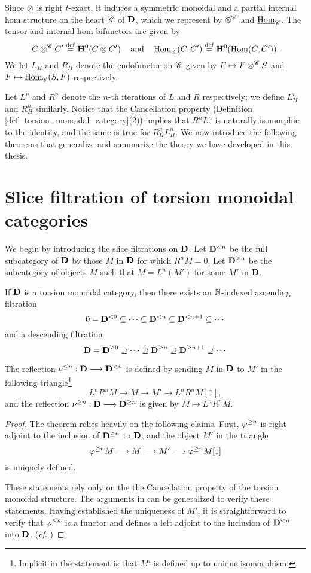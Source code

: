 Since $\otimes$ is right $t$-exact, it induces a symmetric 
monoidal and a partial internal hom structure on the heart 
$\mathscr{C}$ of $\mathbf{D}$, which we represent by $\otimes^{\mathscr{C}}$ 
and $\underline{\mathrm{Hom}}_{\mathscr{C}}$. The tensor and internal hom bifunctors
are given by
\[
C \otimes^{\mathscr{C}} C' \stackrel{\mathrm{def}}{=} \mathbf{H}^0(C \otimes C') 
   \;\;\;\textrm{ and }\;\;\;
\underline{\mathrm{Hom}}_{\mathscr{C}}(C, C') \stackrel{\mathrm{def}}{=} \mathbf{H}^0(\underline{\mathrm{Hom}}(C, C')).
\]
We let $L_H$ and $R_H$ denote the endofunctor on 
$\mathscr{C}$ given by $F \mapsto F \otimes^{\mathscr{C}} S$ and $F \mapsto
\underline{\mathrm{Hom}}_{\mathscr{C}}(S, F)$ respectively.

Let $L^n$ and $R^n$ denote the $n$-th iterations of $L$ and $R$ 
respectively; we define $L_H^n$ and $R_H^n$ similarly. Notice that 
the Cancellation property (Definition 
\ref{def_torsion_monoidal_category}(2)) implies that $R^nL^n$ is 
naturally isomorphic to the identity, and the same is true for
$R_H^nL_H^n$. We now introduce the following theorems that 
generalize and summarize the theory we have developed in this 
thesis.

\section{Slice filtration of torsion monoidal categories}

We begin by introducing the slice filtrations on $\mathbf{D}$. Let 
$\mathbf{D}^{< n}$ be the full subcategory of $\mathbf{D}$ by those 
$M$ in $\mathbf{D}$ for which $R^n M = 0$. Let $\mathbf{D}^{\geq n}$ be 
the subcategory of objects $M$ such that $M = L^n(M')$ for some 
$M'$ in $\mathbf{D}$.

\begin{thm}\label{thm_summary_triang_cat}
If $\mathbf{D}$ is a torsion monoidal category, then there exists
an $\mathbb{N}$-indexed ascending filtration
\[
0 = \mathbf{D}^{< 0} \subseteq \cdots \subseteq \mathbf{D}^{< n}
   \subseteq \mathbf{D}^{< n + 1} \subseteq \cdots
\]
and a descending filtration
\[
\mathbf{D} = \mathbf{D}^{\geq 0} \supseteq \cdots \supseteq \mathbf{D}^{\geq n}
\supseteq \mathbf{D}^{\geq n + 1} \supseteq \cdots
\]

The reflection $\nu^{\leq n} : \mathbf{D} \longrightarrow \mathbf{D}^{< n}$ is defined 
by sending $M$ in $\mathbf{D}$ to $M'$ in the following 
triangle\footnote{Implicit in the statement is that $M'$ is 
defined up to unique isomorphism.}
\[
L^nR^n M \to M \to M' \to L^nR^n M[1],
\]
and the reflection $\nu^{\geq n} : \mathbf{D} \longrightarrow \mathbf{D}^{\geq n}$ is
given by $M \mapsto L^nR^n M$.
\end{thm}
\begin{proof}
The theorem relies heavily on the following claims. First, 
$\varphi^{\geq n}$ is right adjoint to the inclusion of 
$\mathbf{D}^{\geq n}$ to $\mathbf{D}$, and the object $M'$ in the triangle
\[
\varphi^{\geq n}M \longrightarrow M \longrightarrow M' \longrightarrow \varphi^{\geq n}M[1]
\]
is uniquely defined.

These statements rely only on the the Cancellation property of the 
torsion monoidal structure. The arguments in \cite[1.1, 1.4i]{HuKa}
can be generalized to verify these statements. Having established
the uniqueness of $M'$, it is straightforward to verify that 
$\varphi^{\leq n}$ is a functor and defines a left adjoint to the 
inclusion of $\mathbf{D}^{< n}$ into $\mathbf{D}$. (\emph{cf}. 
\cite[1.4]{HuKa})
\end{proof}

